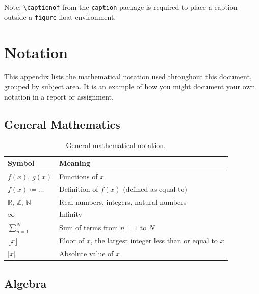 \vspace{0.5em}
\noindent Note: \texttt{\textbackslash captionof} from the \texttt{caption} package is required to place a caption outside a \texttt{figure} float environment.

\newpage
\section{Notation}

This appendix lists the mathematical notation used throughout this document, grouped by subject area. It is an example of how you might document your own notation in a report or assignment.

\subsection{General Mathematics}

\begin{table}[H]
	\centering
	\caption{General mathematical notation.}
	\label{tab:notation-general}
	\begin{tabularx}{\linewidth}{@{}lX@{}}
		\toprule
		Symbol & Meaning \\
		\midrule
		$f(x)$, $g(x)$              & Functions of $x$ \\
		$f(x) \coloneqq \ldots$     & Definition of $f(x)$ (defined as equal to) \\
		$\mathbb{R}$, $\mathbb{Z}$, $\mathbb{N}$ & Real numbers, integers, natural numbers \\
		$\infty$                    & Infinity \\
		$\sum_{n=1}^{N}$            & Sum of terms from $n = 1$ to $N$ \\
		$\lfloor x \rfloor$         & Floor of $x$, the largest integer less than or equal to $x$ \\
		$|x|$                       & Absolute value of $x$ \\
		\bottomrule
	\end{tabularx}
\end{table}

\subsection{Algebra}

